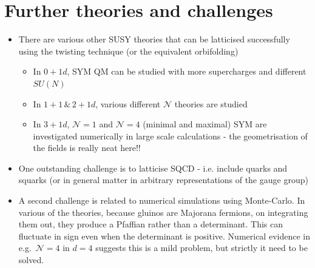 \section{Further theories and challenges}

\begin{itemize}
    \item There are various other SUSY theories that can be latticised successfully using the twisting technique (or the equivalent orbifolding)
    \begin{itemize}
        \item In $0+1d$, SYM QM can be studied with more supercharges and different $SU(N)$
        \item In $1+1 \, \& \, 2+1d$, various different $\mathcal{N}$ theories are studied
        \item In $3 + 1d$, $\mathcal{N} = 1$ and $\mathcal{N} = 4$ (minimal and maximal) SYM are investigated numerically in large scale calculations - the geometrisation of the fields is really neat here!!
    \end{itemize}
    \item One  outstanding challenge is to latticise SQCD - i.e. include quarks and squarks (or in general matter in arbitrary representations of the gauge group)
    \item A second challenge is related to numerical simulations using Monte-Carlo. In various of the theories, because gluinos are Majorana fermions, on integrating them out, they produce a Pfaffian rather than a determinant. This can fluctuate in sign even when the determinant is positive. Numerical evidence in e.g.\ $\mathcal{N}=4$ in $d=4$ suggests this is a mild problem, but strictly it need to be solved.
\end{itemize}
